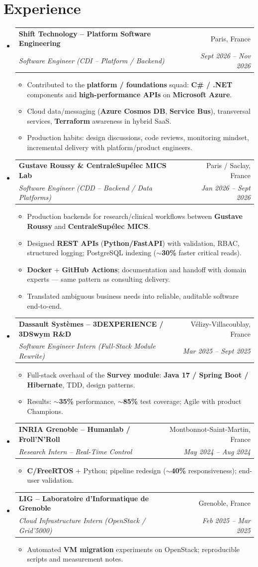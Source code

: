 \documentclass[letterpaper,10.5pt]{article}
\makeatletter
\newcommand{\resumeItem}[1]{\item\small{#1 \vspace{-1.5pt}}}
\newcommand{\resumeSubheading}[4]{\vspace{-1pt}\item\begin{tabular*}{0.97\textwidth}[t]{l@{\extracolsep{\fill}}r}\textbf{#1} & #2 \\\textit{\small#3} & \textit{\small #4} \\\end{tabular*}\vspace{-5pt}}
\newcommand{\resumeSubHeadingListStart}{\begin{itemize}[leftmargin=0.15in, label={}]}
\newcommand{\resumeSubHeadingListEnd}{\end{itemize}}
\newcommand{\resumeItemListStart}{\begin{itemize}[leftmargin=0.18in]}
\newcommand{\resumeItemListEnd}{\end{itemize}\vspace{-3pt}}
\makeatother
\begin{document}
\section{Experience}
\resumeSubHeadingListStart
  \resumeSubheading
    {Shift Technology -- Platform Software Engineering}{Paris, France}
    {Software Engineer (CDI -- Platform / Backend)}{Sept 2026 -- Nov 2026}
    \resumeItemListStart
      \resumeItem{Contributed to the \textbf{platform / foundations} squad: \textbf{C\# / .NET} components and \textbf{high-performance APIs} on \textbf{Microsoft Azure}.}
      \resumeItem{Cloud data/messaging (\textbf{Azure Cosmos DB}, \textbf{Service Bus}), transversal services, \textbf{Terraform} awareness in hybrid SaaS.}
      \resumeItem{Production habits: design discussions, code reviews, monitoring mindset, incremental delivery with platform/product engineers.}
    \resumeItemListEnd
  \resumeSubheading
    {Gustave Roussy \& CentraleSup\'elec MICS Lab}{Paris / Saclay, France}
    {Software Engineer (CDD -- Backend / Data Platforms)}{Jan 2026 -- Sept 2026}
    \resumeItemListStart
      \resumeItem{Production backends for research/clinical workflows between \textbf{Gustave Roussy} and \textbf{CentraleSup\'elec MICS}.}
      \resumeItem{Designed \textbf{REST APIs} (\textbf{Python/FastAPI}) with validation, RBAC, structured logging; PostgreSQL indexing (\textbf{$\sim$30\%} faster critical reads).}
      \resumeItem{\textbf{Docker} + \textbf{GitHub Actions}; documentation and handoff with domain experts --- same pattern as consulting delivery.}
      \resumeItem{Translated ambiguous business needs into reliable, auditable software end-to-end.}
    \resumeItemListEnd
  \resumeSubheading
    {Dassault Syst\`emes -- 3DEXPERIENCE / 3DSwym R\&D}{V\'elizy-Villacoublay, France}
    {Software Engineer Intern (Full-Stack Module Rewrite)}{Mar 2025 -- Sept 2025}
    \resumeItemListStart
      \resumeItem{Full-stack overhaul of the \textbf{Survey module}: \textbf{Java 17 / Spring Boot / Hibernate}, TDD, design patterns.}
      \resumeItem{Results: \textbf{$\sim$35\%} performance, \textbf{$\sim$85\%} test coverage; Agile with product Champions.}
    \resumeItemListEnd
  \resumeSubheading
    {INRIA Grenoble -- Humanlab / Froll'N'Roll}{Montbonnot-Saint-Martin, France}
    {Research Intern -- Real-Time Control}{May 2024 -- Aug 2024}
    \resumeItemListStart
      \resumeItem{\textbf{C/FreeRTOS} + Python; pipeline redesign (\textbf{$\sim$40\%} responsiveness); end-user validation.}
    \resumeItemListEnd
  \resumeSubheading
    {LIG -- Laboratoire d'Informatique de Grenoble}{Grenoble, France}
    {Cloud Infrastructure Intern (OpenStack / Grid'5000)}{Feb 2025 -- Mar 2025}
    \resumeItemListStart
      \resumeItem{Automated \textbf{VM migration} experiments on OpenStack; reproducible scripts and measurement notes.}
    \resumeItemListEnd
\resumeSubHeadingListEnd
\end{document}
